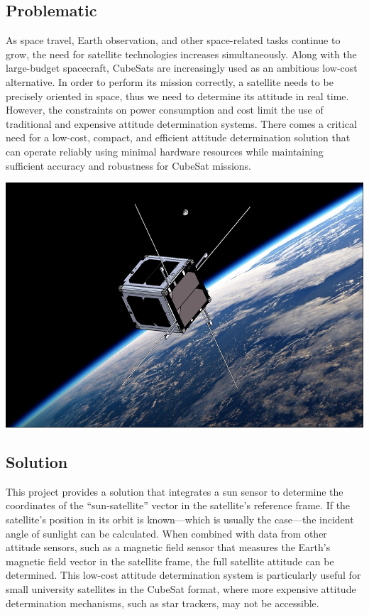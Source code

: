 \documentclass[a4paper, 12pt]{article}
\begin{document}
\begin{minipage}{0.55\textwidth}
\subsection{Problematic}
As space travel, Earth observation, and other space-related tasks continue to grow, the need for satellite technologies increases simultaneously. Along with the large-budget spacecraft, CubeSats are increasingly used as an ambitious low-cost alternative. In order to perform its mission correctly, a satellite needs to be precisely oriented in space, thus we need to determine its attitude in real time. However, the constraints on power consumption and cost limit the use of traditional and expensive attitude determination systems. There comes a critical need for a low-cost, compact, and efficient attitude determination solution that can operate reliably using minimal hardware resources while maintaining sufficient accuracy and robustness for CubeSat missions.
\end{minipage}
\hfill
\begin{minipage}{0.4\textwidth}
    \includegraphics[width=\linewidth]{fig/cubesat.png}
    \label{fig:CubeSat}
\end{minipage}


\subsection{Solution}
This project provides a solution that integrates a sun sensor to determine the coordinates of the “sun-satellite” vector in the satellite’s reference frame. If the satellite’s position in its orbit is known—which is usually the case—the incident angle of sunlight can be calculated. When combined with data from other attitude sensors, such as a magnetic field sensor that measures the Earth’s magnetic field vector in the satellite frame, the full satellite attitude can be determined. \cite{nurgizat_solar_2021} This low-cost attitude determination system is particularly useful for small university satellites in the CubeSat format, where more expensive attitude determination mechanisms, such as star trackers, may not be accessible.\cite{nurgizat_low-cost_2023}
\end{document}
